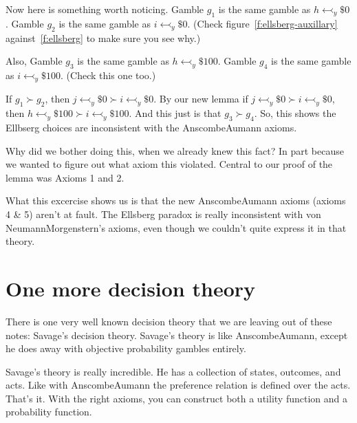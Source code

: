Now here is something worth noticing.  Gamble $g_1$ is the same gamble as $h \leftarrowtail_y \$0$. Gamble $g_2$ is the same gamble as $i \leftarrowtail_y \$0$.  (Check figure~\ref{f:ellsberg-auxillary} against~\ref{f:ellsberg} to make sure you see why.)

Also, Gamble $g_3$ is the same gamble as $h \leftarrowtail_y \$100$. Gamble $g_4$ is the same gamble as 
$i \leftarrowtail_y \$100$. (Check this one too.)

If $g_1 \succ g_2$, then $j \leftarrowtail_y \$0 \succ i \leftarrowtail_y \$0$. By our new lemma if $j \leftarrowtail_y \$0 \succ i \leftarrowtail_y \$0$, then $h \leftarrowtail_y \$100 \succ i \leftarrowtail_y \$100$.  And this just is that  $g_3 \succ g_4$.  So, this shows the Ellbserg choices are inconsistent with the Anscombe\breakslash Aumann axioms.

Why did we bother doing this, when we already knew this fact?  In part because we wanted to figure out what axiom this violated. Central to our proof of the lemma was Axioms 1 and 2. 

What this excercise shows us is that the new Anscombe\breakslash Aumann axioms (axioms 4 \& 5) aren't at fault.  The Ellsberg paradox is really inconsistent with von Neumann\breakslash Morgenstern's axioms, even though we couldn't quite express it in that theory.

\section{One more decision theory}

There is one very well known decision theory that we are leaving out of these notes: Savage's decision theory.  Savage's theory is like Anscombe\breakslash Aumann, except he does away with objective probability gambles entirely.

Savage's theory is really incredible.  He has a collection of states, outcomes, and acts. Like with Anscombe\breakslash Aumann the preference relation is defined over the acts. That's it.  With the right axioms, you can construct both a utility function and a probability function.  

